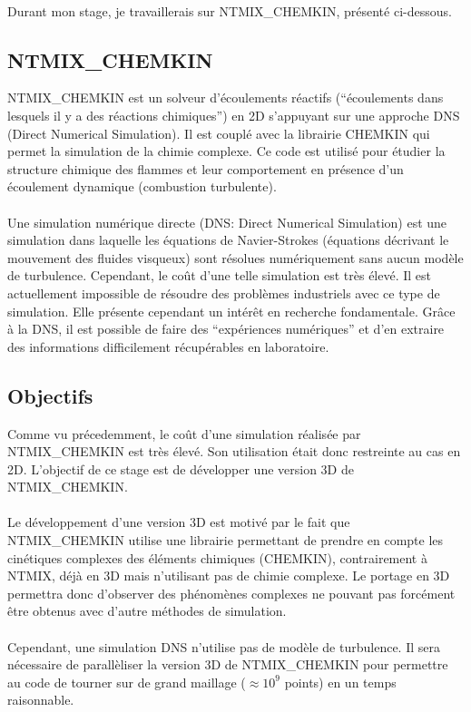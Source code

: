 \paragraph{}Durant mon stage, je travaillerais sur NTMIX\_CHEMKIN, présenté ci-dessous.


\subsection*{NTMIX\_CHEMKIN}
NTMIX\_CHEMKIN est un solveur d'écoulements réactifs (``écoulements dans lesquels il y a des réactions chimiques'') en 2D s'appuyant sur une approche DNS (Direct Numerical Simulation). Il est couplé avec la librairie CHEMKIN qui permet la simulation de la chimie complexe. Ce code est utilisé pour étudier la structure chimique des flammes et leur comportement en présence d'un écoulement dynamique (combustion turbulente).\cite{cerfacs}

\paragraph{}
Une simulation numérique directe (DNS: Direct Numerical Simulation) est une simulation dans laquelle les équations de Navier-Strokes (équations décrivant le mouvement des fluides visqueux) sont résolues numériquement sans aucun modèle de turbulence. Cependant, le coût d'une telle simulation est très élevé. Il est actuellement impossible de résoudre des problèmes industriels avec ce type de simulation. Elle présente cependant un intérêt en recherche fondamentale. Grâce à la DNS, il est possible de faire des ``expériences numériques'' et d'en extraire des informations difficilement récupérables en laboratoire.\cite{cfd-online-DNS}


\subsection*{Objectifs}
Comme vu précedemment, le coût d'une simulation réalisée par NTMIX\_CHEMKIN est très élevé. Son utilisation était donc restreinte au cas en 2D. L'objectif de ce stage est de développer une version 3D de NTMIX\_CHEMKIN.

\paragraph{}Le développement d'une version 3D est motivé par le fait que NTMIX\_CHEMKIN utilise une librairie permettant de prendre en compte les cinétiques complexes des éléments chimiques (CHEMKIN), contrairement à NTMIX, déjà en 3D mais n'utilisant pas de chimie complexe. Le portage en 3D permettra donc d'observer des phénomènes complexes ne pouvant pas forcément être obtenus avec d'autre méthodes de simulation.

\paragraph{}Cependant, une simulation DNS n'utilise pas de modèle de turbulence. Il sera nécessaire de parallèliser la version 3D de NTMIX\_CHEMKIN pour permettre au code de tourner sur de grand maillage ($\approx 10^9$ points) en un temps raisonnable.

